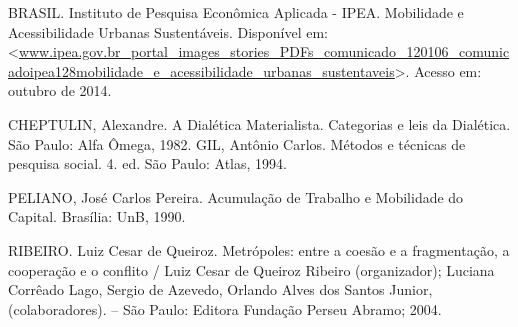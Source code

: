 \documentclass[article,12pt,onesidea,4paper,english,brazil]{abntex2}
\begin{document}
	\noindent BRASIL. Instituto de Pesquisa Econômica Aplicada - IPEA. Mobilidade e Acessibilidade Urbanas Sustentáveis. Disponível em: <\url{www.ipea.gov.br\_portal\_images\_stories\_PDFs\_comunicado\_120106\_comunicadoipea128mobilidade\_e\_acessibilidade\_urbanas\_sustentaveis}>. Acesso em: outubro de 2014.
	
	\noindent CHEPTULIN, Alexandre. A Dialética Materialista. Categorias e leis da Dialética. São Paulo: Alfa Ômega, 1982.
	GIL, Antônio Carlos. Métodos e técnicas de pesquisa social. 4. ed. São Paulo: Atlas, 1994.
	
	\noindent PELIANO, José Carlos Pereira. Acumulação de Trabalho e Mobilidade do Capital. Brasília: UnB, 1990.
	
	\noindent RIBEIRO. Luiz Cesar de Queiroz. Metrópoles: entre a coesão e a fragmentação, a cooperação e o conflito / Luiz Cesar de Queiroz Ribeiro (organizador); Luciana Corrêado Lago, Sergio de Azevedo, Orlando Alves dos Santos Junior, (colaboradores). – São Paulo: Editora Fundação Perseu Abramo; 2004.
	
\end{document}
